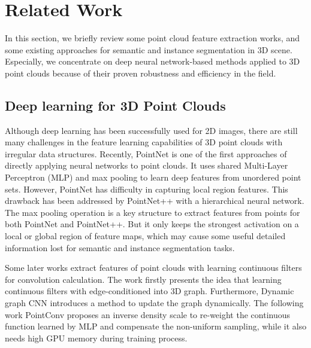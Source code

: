 \documentclass[letterpaper]{article} \usepackage{aaai20}  \usepackage{times}  \usepackage{helvet} \usepackage{courier}  \usepackage[hyphens]{url}  \usepackage{graphicx} \urlstyle{rm} \def\UrlFont{\rm}  \usepackage{graphicx}  \frenchspacing  \setlength{\pdfpagewidth}{8.5in}  \setlength{\pdfpageheight}{11in}
\begin{document}
\section{Related Work}
In this section, we briefly review some point cloud feature extraction works, and some existing approaches for semantic and instance segmentation in 3D scene. Especially, we concentrate on deep neural network-based methods applied to 3D point clouds because of their proven robustness and efficiency in the field.

\subsection{Deep learning for 3D Point Clouds}
Although deep learning has been successfully used for 2D images, there are still many challenges in the feature learning capabilities of 3D point clouds with irregular data structures. Recently, PointNet \cite{qi2016pointnet} is one of the first approaches of directly applying neural networks to point clouds. It uses shared Multi-Layer Perceptron (MLP) and max pooling to learn deep features from unordered point sets. However, PointNet has difficulty in capturing local region features. This drawback has been addressed by PointNet++ \cite{qi2017pointnet++} with a hierarchical neural network. The max pooling operation is a key structure to extract features from points for both PointNet and PointNet++. But it only keeps the strongest activation on a local or global region of feature maps, which may cause some useful detailed information lost for semantic and instance segmentation tasks.

Some later works \cite{Simonovsky_2017_CVPR,hermosilla2018monte,xu2018spidercnn} extract features of point clouds with learning continuous filters for convolution calculation. The work \cite{Simonovsky_2017_CVPR} firstly presents the idea that learning continuous filters with edge-conditioned into 3D graph. Furthermore, Dynamic graph CNN \cite{wang2018dynamic} introduces a method to update the graph dynamically. The following work PointConv \cite{wu2018pointconv} proposes an inverse density scale to re-weight the continuous function learned by MLP and compensate the non-uniform sampling, while it also needs high GPU memory during training process.
\end{document}
